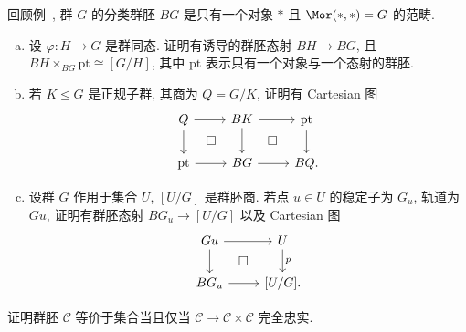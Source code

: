 \begin{exercise}[有益的练习]\label{src:3.4.31}
回顾例~, 群 $G$ 的分类群胚 $BG$ 是只有一个对象 $*$ 且 $\Mor(*,*)=G$ 的范畴.
\begin{enumerate}[(a)]
\item 设 $\varphi:H\to G$ 是群同态. 证明有诱导的群胚态射 $BH\to BG$, 且 $BH\times_{BG}\mathrm{pt}\cong[G/H]$, 其中 $\mathrm{pt}$ 表示只有一个对象与一个态射的群胚.
\item 若 $K\trianglelefteq G$ 是正规子群, 其商为 $Q=G/K$, 证明有 Cartesian 图
\[
\begin{tikzcd}
Q\arrow[r]\arrow[d]\arrow[dr,phantom,"\square"]&
BK\arrow[r]\arrow[d]\arrow[dr,phantom,"\square"]&
\mathrm{pt}\arrow[d]\\
\mathrm{pt}\arrow[r]&BG\arrow[r]&BQ.
\end{tikzcd}
\]
\item 设群 $G$ 作用于集合 $U$, $[U/G]$ 是群胚商. 若点 $u\in U$ 的稳定子为 $G_u$, 轨道为 $Gu$, 证明有群胚态射 $BG_u\to[U/G]$ 以及 Cartesian 图
\[
\begin{tikzcd}
Gu\arrow[r]\arrow[d]\arrow[dr,phantom,"\square"]&U\arrow[d,"p"]\\
BG_u\arrow[r]&{[U/G]}.
\end{tikzcd}
\]
\end{enumerate}
\end{exercise}
\begin{exercise}[重要]\label{src:3.4.32}
证明群胚 $\mathcal C$ 等价于集合当且仅当 $\mathcal C\to\mathcal C\times\mathcal C$ 完全忠实.
\end{exercise}


